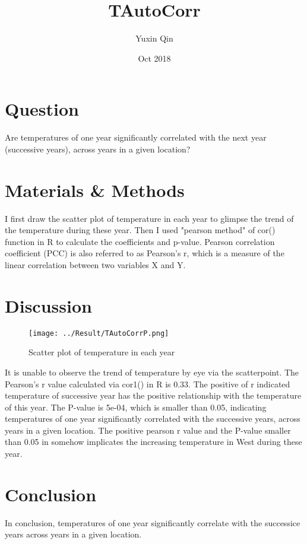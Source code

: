 \documentclass[12pt]{article}
\title{TAutoCorr}
\author{Yuxin Qin}
\date{Oct 2018}
\begin{document}
  \maketitle

  \section{Question}
    Are temperatures of one year significantly correlated with the next year (successive years), across years in a given location?

  \section{Materials \& Methods}
    I first draw the scatter plot of temperature in each year to glimpse the trend of the temperature during these year.
    Then I used "pearson method" of cor() function in R to calculate the coefficients and p-value. Pearson correlation coefficient (PCC) is also referred to as Pearson's r, which is a measure of the linear correlation between two variables X and Y. 

  \section{Discussion}
  \begin{figure}
	\centering
	\texttt{[image: ../Result/TAutoCorrP.png]}
	\caption{Scatter plot of temperature in each year}
  \end{figure}
    
    It is unable to observe the trend of temperature by eye via the scatterpoint. 
    The Pearson's r value calculated via cor1() in R is 0.33. The positive of r indicated temperature of successive year has the positive relationship with the temperature of this year. 
    The P-value is 5e-04, which is smaller than 0.05, indicating temperatures of one year significantly correlated with the successive years, across years in a given location.
    The positive pearson r value and the P-value smaller than 0.05 in somehow implicates the increasing temperature in West during these year.

  \section{Conclusion}
    In conclusion, temperatures of one year significantly correlate with the successice years across years in a given location. 
  
\end{document}
